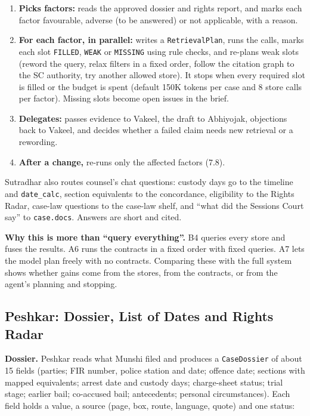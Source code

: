 \documentclass[10pt,a4paper]{article}
\newcommand{\st}[1]{\texttt{\small #1}}
\begin{document}
\begin{enumerate}
\item \textbf{Picks factors:} reads the approved dossier and rights report, and marks each factor favourable, adverse (to be answered) or not applicable, with a reason.
\item \textbf{For each factor, in parallel:} writes a \st{RetrievalPlan}, runs the calls, marks each slot \st{FILLED}, \st{WEAK} or \st{MISSING} using rule checks, and re-plans weak slots (reword the query, relax filters in a fixed order, follow the citation graph to the SC authority, try another allowed store). It stops when every required slot is filled or the budget is spent (default 150K tokens per case and 8 store calls per factor). Missing slots become open issues in the brief.
\item \textbf{Delegates:} passes evidence to Vakeel, the draft to Abhiyojak, objections back to Vakeel, and decides whether a failed claim needs new retrieval or a rewording.
\item \textbf{After a change,} re-runs only the affected factors (7.8).
\end{enumerate}

Sutradhar also routes counsel's chat questions: custody days go to the timeline and \st{date\_\allowbreak{}calc}, section equivalents to the concordance, eligibility to the Rights Radar, case-law questions to the case-law shelf, and ``what did the Sessions Court say'' to \st{case.docs}. Answers are short and cited.

\textbf{Why this is more than ``query everything''.} B4 queries every store and fuses the results. A6 runs the contracts in a fixed order with fixed queries. A7 lets the model plan freely with no contracts. Comparing these with the full system shows whether gains come from the stores, from the contracts, or from the agent's planning and stopping.

\subsection{Peshkar: Dossier, List of Dates and Rights Radar}

\textbf{Dossier.} Peshkar reads what Munshi filed and produces a \st{CaseDossier} of about 15 fields (parties; FIR number, police station and date; offence date; sections with mapped equivalents; arrest date and custody days; charge-sheet status; trial stage; earlier bail; co-accused bail; antecedents; personal circumstances). Each field holds a value, a source (page, box, route, language, quote) and one status:
\end{document}
